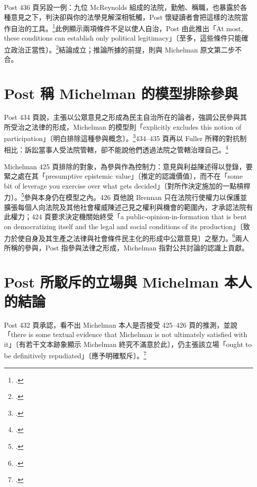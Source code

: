 Post 436 頁另設一例：九位 McReynolds 組成的法院，勤勉、稱職，也暴露於各種意見之下，判決卻與你的法學見解深相牴觸，Post 懷疑讀者會把這樣的法院當作自治的工具。\footcite[435--436]{post1998}此例顯示兩項條件不足以使人自治，Post 由此推出「At most, these conditions can establish only political legitimacy」〔至多，這些條件只能確立政治正當性〕。\footcite[436]{post1998}結論成立；推論所據的前提，則與 Michelman 原文第二步不合。

\section{Post 稱 Michelman 的模型排除參與}
\label{sec:70_misreadings-3}

Post 434 頁說，主張以公眾意見之形成為民主自治所在的論者，強調公民參與其所受治之法律的形成，Michelman 的模型則「explicitly excludes this notion of participation」〔明白排除這種參與概念〕。\footcite[434]{post1998}434--435 頁再以 Fuller 所釋的對抗制相比：訴訟當事人受法院管轄，卻不能說他們透過法院之管轄治理自己。\footcite[434--435]{post1998}

Michelman 425 頁排除的對象，為參與作為控制力：意見與利益陳述得以登錄，要緊之處在其「presumptive epistemic value」〔推定的認識價值〕，而不在「some bit of leverage you exercise over what gets decided」〔對所作決定施加的一點槓桿力〕。\footcite[425]{michelman1998}參與本身仍在模型之內。426 頁他說 Brennan 只在法院行使權力以保護並擴張每個人向法院及其他社會權威陳述己見之權利與機會的範圍內，才承認法院有此權力；424 頁要求決定機關始終受「a public-opinion-in-formation that is bent on democratizing itself and the legal and social conditions of its production」〔致力於使自身及其生產之法律與社會條件民主化的形成中公眾意見〕之壓力。\footcite[424, 426]{michelman1998}兩人所稱的參與，Post 指參與法律之形成，Michelman 指對公共討論的認識上貢獻。

\section{Post 所駁斥的立場與 Michelman 本人的結論}
\label{sec:70_misreadings-4}

Post 432 頁承認，看不出 Michelman 本人是否接受 425--426 頁的推測，並說「there is some textual evidence that Michelman is not ultimately satisfied with it」〔有若干文本跡象顯示 Michelman 終究不滿意於此〕，仍主張該立場「ought to be definitively repudiated」〔應予明確駁斥〕。\footcite[432]{post1998}

